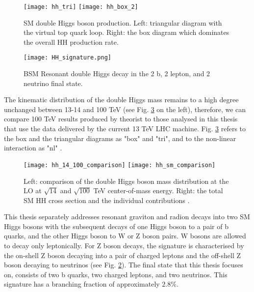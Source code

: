 \begin{figure}[H]
  \centering
    \texttt{[image: hh\_tri]}
     \texttt{[image: hh\_box\_2]}
    \caption[SM double Higgs boson production]{SM double Higgs boson production. Left: triangular diagram with the virtual top quark loop. Right: the box diagram which dominates the overall HH production rate.}
    \label{SM_HH}
\end{figure}

\begin{figure}[H]
  \centering
    \texttt{[image: HH\_signature.png]}
    \caption{BSM Resonant double Higgs decay in the 2 b, 2 lepton, and 2 neutrino final state. }
    \label{HH_signature}
\end{figure}


The kinematic distribution of the double Higgs mass remains to a high degree unchanged between 13-14 and 100 TeV (see Fig. \ref{hh_comparison} on the left), therefore, we can compare 100 TeV results produced by theorist to those analysed in this thesis that use the data delivered by the current 13 TeV LHC machine. Fig. \ref{hh_comparison} refers to the box and the triangular diagrams as "box" and "tri", and to the non-linear interaction as "nl"  \cite{Contino:2012xk}. 

\begin{figure}[H]
  \centering 
    \texttt{[image: hh\_14\_100\_comparison]}
    \texttt{[image: hh\_sm\_comparison]}
    \caption[Double Higgs mass distribution and the total cross-section]{Left: comparison of the double Higgs boson mass distribution at the LO at $\sqrt{14}$ and $\sqrt{100}$ TeV center-of-mass energy. Right: the total SM HH cross section and the individual contributions \cite{Contino:2012xk}.}
    \label{hh_comparison}
\end{figure}

This thesis separately addresses resonant graviton and radion decays into two SM Higgs bosons with the subsequent decays of one Higgs boson to a pair of b quarks, and the other Higgs boson to W or Z boson pairs. W bosons are allowed to decay only leptonically. For Z boson decays, the signature is characterised by the on-shell Z boson decaying into a pair of charged leptons and the off-shell Z boson decaying to neutrinos (see Fig. \ref{HH_signature}). The final state that this thesis focuses on, consists of two b quarks, two charged leptons, and two neutrinos. This signature has a branching fraction of approximately $2.8 \%$. 


